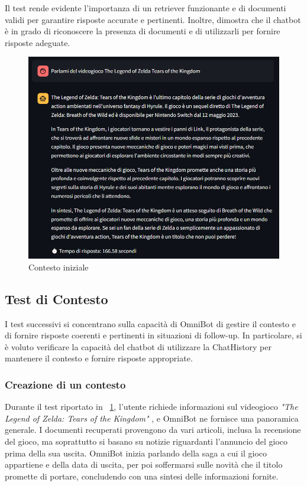 Il test rende evidente l'importanza di un retriever funzionante e di documenti validi per garantire risposte accurate e pertinenti. Inoltre, dimostra che il chatbot è in grado di riconoscere la presenza di documenti e di utilizzarli per fornire risposte adeguate.

\begin{figure}[!t]
    \centering
    \includegraphics[width=\textwidth]{Images/cap5/altro_rag.PNG}
    \caption{Contesto iniziale}
    \label{fig:history1}
\end{figure}

\subsection{Test di Contesto}
I test successivi si concentrano sulla capacità di OmniBot di gestire il contesto e di fornire risposte coerenti e pertinenti in situazioni di follow-up. In particolare, si è voluto verificare la capacità del chatbot di utilizzare la ChatHistory per mantenere il contesto e fornire risposte appropriate.

\subsubsection{Creazione di un contesto}
Durante il test riportato in \figurename{~\ref{fig:history1}}, l'utente richiede informazioni sul videogioco \textit{"The Legend of Zelda: Tears of the Kingdom"} \cite{zelda}, e OmniBot ne fornisce una panoramica generale. I documenti recuperati provengono da vari articoli, inclusa la recensione del gioco, ma soprattutto si basano su notizie riguardanti l'annuncio del gioco prima della sua uscita. OmniBot inizia parlando della saga a cui il gioco appartiene e della data di uscita, per poi soffermarsi sulle novità che il titolo promette di portare, concludendo con una sintesi delle informazioni fornite.

